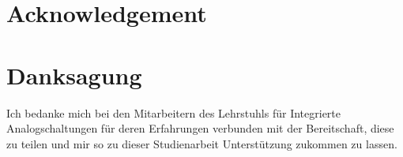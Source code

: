 { \chapter{Acknowledgement} }
{ \chapter{Danksagung}		}
Ich bedanke mich bei den Mitarbeitern des Lehrstuhls für Integrierte Analogschaltungen für deren Erfahrungen verbunden mit der Bereitschaft, diese zu teilen und mir so zu dieser Studienarbeit Unterstützung zukommen zu lassen.